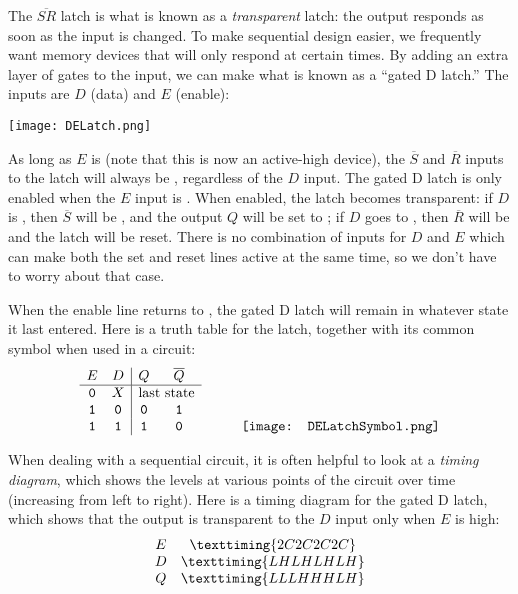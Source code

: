 The $\overline{SR}$ latch is what is known as a \textit{transparent} latch: the output responds as soon as the input is changed. To make sequential design easier, we frequently want memory devices that will only respond at certain times. By adding an extra layer of gates to the input, we can make what is known as a ``gated D latch.'' The inputs are $D$ (data) and $E$ (enable):
\begin{center}
\texttt{[image: DELatch.png]}
\end{center}
As long as $E$ is \0 (note that this is now an active-high device), the $\overline{S}$ and $\overline{R}$ inputs to the latch will always be \1, regardless of the $D$ input. The gated D latch is only enabled when the $E$ input is \1. When enabled, the latch becomes transparent: if $D$ is \1, then $\overline{S}$ will be \0, and the output $Q$ will be set to \1; if $D$ goes to \0, then $\overline{R}$ will be \0 and the latch will be reset. There is no combination of inputs for $D$ and $E$ which can make both the set and reset lines active at the same time, so we don't have to worry about that case.

When the enable line returns to \0, the gated D latch will remain in whatever state it last entered. Here is a truth table for the latch, together with its common symbol when used in a circuit:
\[ \begin{array}[b]{cc|cc}
E & D & Q & \overline{Q}\\ \hline
\0 & X & \multicolumn{2}{c}{\textrm{last state}}\\
\1 & \0 & \0 & \1\\
\1 & \1 & \1 & \0
\end{array}\hspace{1cm}
\texttt{[image: DELatchSymbol.png]}
\]

When dealing with a sequential circuit, it is often helpful to look at a \emph{timing diagram}, which shows the levels at various points of the circuit over time (increasing from left to right). Here is a timing diagram for the gated D latch, which shows that the output is transparent to the $D$ input only when $E$ is high:
\[ \begin{array}{cc}
E & \texttiming{2C2C2C2C}\\
D & \texttiming{LHLHLHLH}\\
Q & \texttiming{LLLHHHLH}
\end{array} \]

